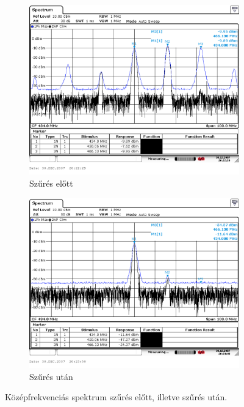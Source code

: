 \begin{figure}[H]
	\centering
	\begin{subfigure}[b]{0.49\textwidth}
		\includegraphics[width=\textwidth,keepaspectratio]{kepek/A_csop_010.PNG}
		\caption{Szűrés előtt}
		\label{fig:KF_elotte}
	\end{subfigure}
	\begin{subfigure}[b]{0.49\textwidth}
		\includegraphics[width=\textwidth,keepaspectratio]{kepek/A_csop_011.PNG}
		\caption{Szűrés után}
		\label{fig:KF_utana}
	\end{subfigure}
	\caption{Középfrekvenciás spektrum szűrés előtt, illetve szűrés után.}
	\label{fig:KF}
\end{figure}

